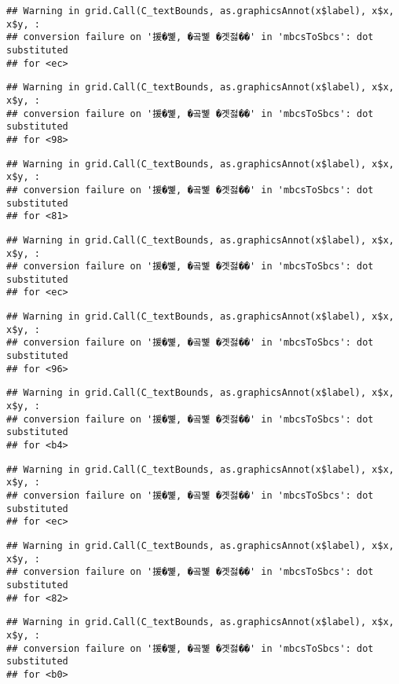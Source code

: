 \documentclass[
]{article}
\begin{document}
\begin{verbatim}
## Warning in grid.Call(C_textBounds, as.graphicsAnnot(x$label), x$x, x$y, :
## conversion failure on '援�뼱, �곸뼱 �곗젏��' in 'mbcsToSbcs': dot substituted
## for <ec>
\end{verbatim}

\begin{verbatim}
## Warning in grid.Call(C_textBounds, as.graphicsAnnot(x$label), x$x, x$y, :
## conversion failure on '援�뼱, �곸뼱 �곗젏��' in 'mbcsToSbcs': dot substituted
## for <98>
\end{verbatim}

\begin{verbatim}
## Warning in grid.Call(C_textBounds, as.graphicsAnnot(x$label), x$x, x$y, :
## conversion failure on '援�뼱, �곸뼱 �곗젏��' in 'mbcsToSbcs': dot substituted
## for <81>
\end{verbatim}

\begin{verbatim}
## Warning in grid.Call(C_textBounds, as.graphicsAnnot(x$label), x$x, x$y, :
## conversion failure on '援�뼱, �곸뼱 �곗젏��' in 'mbcsToSbcs': dot substituted
## for <ec>
\end{verbatim}

\begin{verbatim}
## Warning in grid.Call(C_textBounds, as.graphicsAnnot(x$label), x$x, x$y, :
## conversion failure on '援�뼱, �곸뼱 �곗젏��' in 'mbcsToSbcs': dot substituted
## for <96>
\end{verbatim}

\begin{verbatim}
## Warning in grid.Call(C_textBounds, as.graphicsAnnot(x$label), x$x, x$y, :
## conversion failure on '援�뼱, �곸뼱 �곗젏��' in 'mbcsToSbcs': dot substituted
## for <b4>
\end{verbatim}

\begin{verbatim}
## Warning in grid.Call(C_textBounds, as.graphicsAnnot(x$label), x$x, x$y, :
## conversion failure on '援�뼱, �곸뼱 �곗젏��' in 'mbcsToSbcs': dot substituted
## for <ec>
\end{verbatim}

\begin{verbatim}
## Warning in grid.Call(C_textBounds, as.graphicsAnnot(x$label), x$x, x$y, :
## conversion failure on '援�뼱, �곸뼱 �곗젏��' in 'mbcsToSbcs': dot substituted
## for <82>
\end{verbatim}

\begin{verbatim}
## Warning in grid.Call(C_textBounds, as.graphicsAnnot(x$label), x$x, x$y, :
## conversion failure on '援�뼱, �곸뼱 �곗젏��' in 'mbcsToSbcs': dot substituted
## for <b0>
\end{verbatim}
\end{document}
